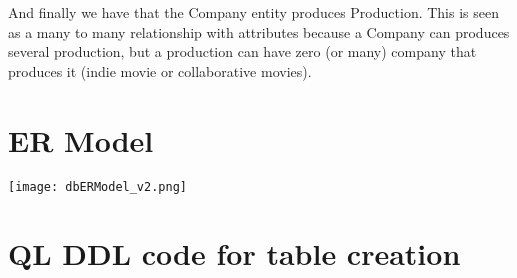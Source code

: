 \documentclass{article}
\begin{document}
\par And finally we have that the Company entity produces Production. This is seen as a many to many relationship with attributes because a Company can produces several production, but a production can have zero (or many) company that produces it (indie movie or collaborative movies).

\vspace{3mm}

\section{ER Model}

\texttt{[image: dbERModel\_v2.png]}

\section{QL DDL code for table creation}
\end{document}
